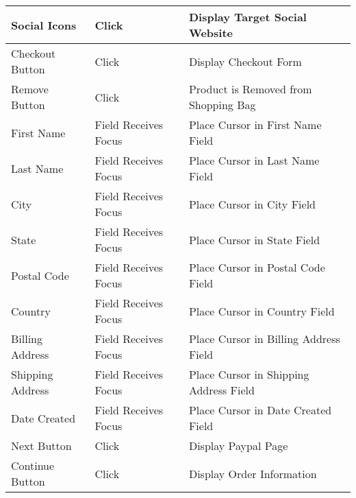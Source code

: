 \documentclass[12pt]{article}
\begin{document}
\begin{center}
	\begin{tabular}{ m{1.5in} | m{1.5in} | m{1.5in} }
	Social Icons & Click & Display Target Social Website \\
	\hline
	Checkout Button 		& Click 					& Display Checkout Form \\
	\hline
	Remove Button 		& Click 					& Product is Removed from Shopping Bag \\
	\hline
	First Name 			& Field Receives Focus 	& Place Cursor in First Name Field \\
	\hline
	Last Name 			& Field Receives Focus 	& Place Cursor in Last Name Field \\
	\hline
	City 				& Field Receives Focus 	& Place Cursor in City Field \\
	\hline
	State 				& Field Receives Focus 	& Place Cursor in State Field \\
	\hline
	Postal Code 			& Field Receives Focus 	& Place Cursor in Postal Code Field \\
	\hline
	Country 				& Field Receives Focus 	& Place Cursor in Country Field \\
	\hline
	Billing Address 		& Field Receives Focus 	& Place Cursor in Billing Address Field \\
	\hline
	Shipping Address 	& Field Receives Focus 	& Place Cursor in Shipping Address Field \\
	\hline
	Date Created 		& Field Receives Focus 	& Place Cursor in Date Created Field \\
	\hline
	Next Button 			& Click 					& Display Paypal Page \\
	\hline
	Continue Button 		& Click 					& Display Order Information \\
	
	\end{tabular}
		
	
\end{center}
\end{document}
